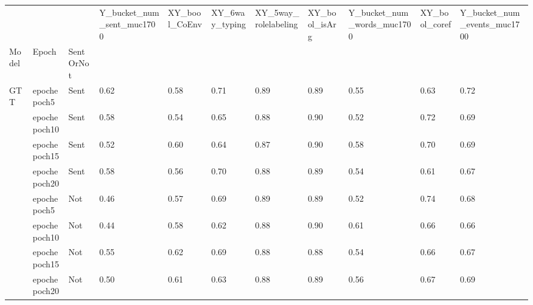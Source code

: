 \begin{tabularx}{\textwidth}{lX|X|X|X|X|X|X|X}
\toprule
    &           &     &  Y\_bucket\_num\_sent\_muc1700 &  XY\_bool\_CoEnv &  XY\_6way\_typing &  XY\_5way\_rolelabeling &  XY\_bool\_isArg &  Y\_bucket\_num\_words\_muc1700 &  XY\_bool\_coref &  Y\_bucket\_num\_events\_muc1700 \\
Model & Epoch & SentOrNot &                            &                &                 &                       &                &                             &                &                              \\
\midrule
GTT & epochepoch5 & Sent &                       0.62 &           0.58 &            0.71 &                  0.89 &           0.89 &                        0.55 &           0.63 &                         0.72 \\
    & epochepoch10 & Sent &                       0.58 &           0.54 &            0.65 &                  0.88 &           0.90 &                        0.52 &           0.72 &                         0.69 \\
    & epochepoch15 & Sent &                       0.52 &           0.60 &            0.64 &                  0.87 &           0.90 &                        0.58 &           0.70 &                         0.69 \\
    & epochepoch20 & Sent &                       0.58 &           0.56 &            0.70 &                  0.88 &           0.89 &                        0.54 &           0.61 &                         0.67 \\
    & epochepoch5 & Not &                       0.46 &           0.57 &            0.69 &                  0.89 &           0.89 &                        0.52 &           0.74 &                         0.68 \\
    & epochepoch10 & Not &                       0.44 &           0.58 &            0.62 &                  0.88 &           0.90 &                        0.61 &           0.66 &                         0.66 \\
    & epochepoch15 & Not &                       0.55 &           0.62 &            0.69 &                  0.88 &           0.88 &                        0.54 &           0.66 &                         0.67 \\
    & epochepoch20 & Not &                       0.50 &           0.61 &            0.63 &                  0.88 &           0.89 &                        0.56 &           0.67 &                         0.69 \\

\end{tabularx}
